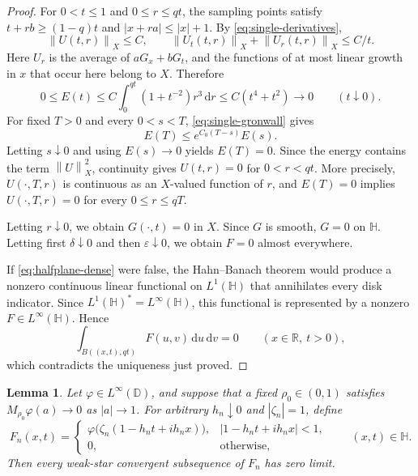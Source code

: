 \documentclass[12pt,a4paper]{article}
\newtheorem{lemma}[theorem]{Lemma}
\theoremstyle{remark}
\newcommand{\D}{\mathbb D}
\newcommand{\dd}{\,\mathrm d}
\newcommand{\norm}[1]{\left\lVert#1\right\rVert}
\begin{document}
\begin{proof}
For $0<t\le1$ and $0\le r\le qt$, the sampling points satisfy
$t+rb\ge(1-q)t$ and $|x+ra|\le|x|+1$. By
\eqref{eq:single-derivatives},
\[
\norm{U(t,r)}_X\le C,
\qquad
\norm{U_t(t,r)}_X+\norm{U_r(t,r)}_X\le C/t.
\]
Here $U_r$ is the average of $aG_x+bG_t$, and the functions of at most
linear growth in $x$ that occur here belong to $X$. Therefore
\[
0\le E(t)\le C\int_0^{qt}(1+t^{-2})r^3\dd r
\le C(t^4+t^2)\longrightarrow0
\qquad(t\downarrow0).
\]
For fixed $T>0$ and every $0<s<T$, \eqref{eq:single-gronwall} gives
\[
E(T)\le e^{C_0(T-s)}E(s).
\]
Letting $s\downarrow0$ and using $E(s)\to0$ yields $E(T)=0$. Since the energy contains the term $\norm U_X^2$, continuity gives $U(t,r)=0$ for $0<r<qt$.
More precisely, $U(\cdot,T,r)$ is continuous as an $X$-valued function of
$r$, and $E(T)=0$ implies $U(\cdot,T,r)=0$ for every $0\le r\le qT$.

Letting $r\downarrow0$, we obtain $G(\cdot,t)=0$ in $X$.
Since $G$ is smooth, $G=0$ on $\mathbb H$.
Letting first $\delta\downarrow0$ and then $\varepsilon\downarrow0$, we obtain $F=0$ almost everywhere.
\medskip

If \eqref{eq:halfplane-dense} were false, the Hahn--Banach theorem would
produce a nonzero continuous linear functional on $L^1(\mathbb H)$ that
annihilates every disk indicator. Since
$L^1(\mathbb H)^*=L^\infty(\mathbb H)$, this functional is represented by a
nonzero $F\in L^\infty(\mathbb H)$. Hence
\[
\int_{B((x,t),qt)}F(u,v)\dd u\dd v=0
\qquad(x\in\mathbb R,\ t>0),
\]
which contradicts the uniqueness just proved.
\end{proof}
\begin{lemma}\label{lem:single-blowup}
Let $\varphi\in L^\infty(\D)$, and suppose that a fixed $\rho_0\in(0,1)$ satisfies
$M_{\rho_0}\varphi(a)\to0$ as $|a|\to1$.
For arbitrary $h_n\downarrow0$ and $|\zeta_n|=1$, define
\[
F_n(x,t)=
\begin{cases}
\varphi\bigl(\zeta_n(1-h_nt+ih_nx)\bigr),
 & |1-h_nt+ih_nx|<1,\\
0,&\text{otherwise},
\end{cases}\qquad (x,t)\in\mathbb H.
\]
Then every weak-star convergent subsequence of $F_n$ has zero limit.
\end{lemma}
\end{document}
